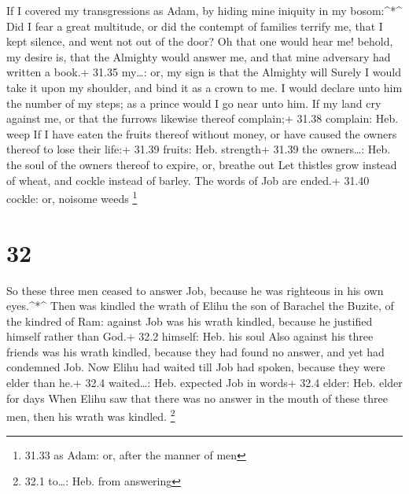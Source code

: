  If I covered my transgressions as Adam, by hiding mine
iniquity in my bosom:\^{}*\^{}  Did I fear a great
multitude, or did the contempt of families terrify me, that I kept
silence, and went not out of the door?  Oh that one would
hear me! behold, my desire is, that the Almighty would answer me, and
that mine adversary had written a book.+ 31.35 my\ldots: or, my sign is
that the Almighty will  Surely I would take it upon my
shoulder, and bind it as a crown to me.  I would declare
unto him the number of my steps; as a prince would I go near unto him.
 If my land cry against me, or that the furrows likewise
thereof complain;+ 31.38 complain: Heb. weep  If I have
eaten the fruits thereof without money, or have caused the owners
thereof to lose their life:+ 31.39 fruits: Heb. strength+ 31.39 the
owners\ldots: Heb. the soul of the owners thereof to expire, or, breathe
out  Let thistles grow instead of wheat, and cockle instead
of barley. The words of Job are ended.+ 31.40 cockle: or, noisome weeds
\footnote{31.33 as Adam: or, after the manner of men}

\hypertarget{section-31}{%
\section{32}\label{section-31}}

 So these three men ceased to answer Job, because he was
righteous in his own eyes.\^{}*\^{}  Then was kindled the
wrath of Elihu the son of Barachel the Buzite, of the kindred of Ram:
against Job was his wrath kindled, because he justified himself rather
than God.+ 32.2 himself: Heb. his soul  Also against his
three friends was his wrath kindled, because they had found no answer,
and yet had condemned Job.  Now Elihu had waited till Job
had spoken, because they were elder than he.+ 32.4 waited\ldots: Heb.
expected Job in words+ 32.4 elder: Heb. elder for days  When
Elihu saw that there was no answer in the mouth of these three men, then
his wrath was kindled. \footnote{32.1 to\ldots: Heb. from answering}

